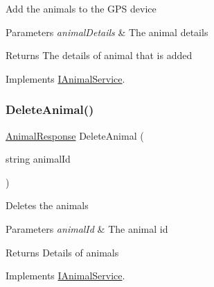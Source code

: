 Add the animals to the G\+PS device 


\begin{DoxyParams}{Parameters}
{\em animal\+Details} & The animal details\\
\hline
\end{DoxyParams}
\begin{DoxyReturn}{Returns}
The details of animal that is added
\end{DoxyReturn}


Implements \hyperlink{interfaceWildLifeTracker_1_1Services_1_1IAnimalService_ae578d708ed9407d8805d69b193eff67b}{I\+Animal\+Service}.

\mbox{\label{classWildLifeTracker_1_1Services_1_1AnimalService_a201e384747e50bd19c431955eae072fa}} 
\subsubsection{\texorpdfstring{Delete\+Animal()}{DeleteAnimal()}}
{\footnotesize\ttfamily \hyperlink{classWildLifeTracker_1_1Response_1_1AnimalResponse}{Animal\+Response} Delete\+Animal (\begin{DoxyParamCaption}\item[{string}]{animal\+Id }\end{DoxyParamCaption})\hspace{0.3cm}{\ttfamily [inline]}}



Deletes the animals 


\begin{DoxyParams}{Parameters}
{\em animal\+Id} & The animal id\\
\hline
\end{DoxyParams}
\begin{DoxyReturn}{Returns}
Details of animals
\end{DoxyReturn}


Implements \hyperlink{interfaceWildLifeTracker_1_1Services_1_1IAnimalService_a201e384747e50bd19c431955eae072fa}{I\+Animal\+Service}.

\mbox{\label{classWildLifeTracker_1_1Services_1_1AnimalService_a38b8ef318dc92ac93cfcbbc33a454c5a}} 
